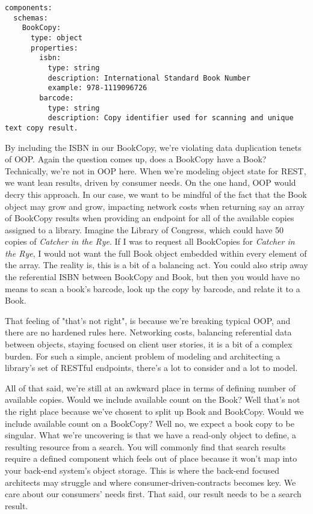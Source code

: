 \begin{minipage}{\linewidth}
\begin{code}
\begin{lstlisting}[belowskip=-\baselineskip]
components:
  schemas:
    BookCopy:
      type: object
      properties:
        isbn:
          type: string
          description: International Standard Book Number
          example: 978-1119096726
        barcode:
          type: string
          description: Copy identifier used for scanning and unique text copy result.
\end{lstlisting}
\end{code}
\end{minipage}

By including the ISBN in our BookCopy, we're violating data duplication tenets of OOP.  Again the question comes up, does a BookCopy have a Book?  Technically, we're not in OOP here.  When we're modeling object state for REST, we want lean results, driven by consumer needs.  On the one hand, OOP would decry this approach.  In our case, we want to be mindful of the fact that the Book object may grow and grow, impacting network costs when returning say an array of BookCopy results when providing an endpoint for all of the available copies assigned to a library.  Imagine the Library of Congress, which could have 50 copies of \textit{Catcher in the Rye}.  If I was to request all BookCopies for \textit{Catcher in the Rye}, I would not want the full Book object embedded within every element of the array.  The reality is, this is a bit of a balancing act.  You could also strip away the referential ISBN between BookCopy and Book, but then you would have no means to scan a book's barcode, look up the copy by barcode, and relate it to a Book.

That feeling of "that's not right", is because we're breaking typical OOP, and there are no hardened rules here.  Networking costs, balancing referential data between objects, staying focused on client user stories, it is a bit of a complex burden.  For such a simple, ancient problem of modeling and architecting a library's set of RESTful endpoints, there's a lot to consider and a lot to model.

All of that said, we're still at an awkward place in terms of defining number of available copies.  Would we include available count on the Book?  Well that's not the right place because we've chosent to split up Book and BookCopy.  Would we include available count on a BookCopy?  Well no, we expect a book copy to be singular.  What we're uncovering is that we have a read-only object to define, a resulting resource from a search.  You will commonly find that search results require a defined component which feels out of place because it won't map into your back-end system's object storage.  This is where the back-end focused architects may struggle and where consumer-driven-contracts becomes key.  We care about our consumers' needs first.  That said, our result needs to be a search result.

